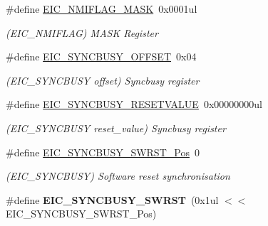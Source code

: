 \begin{DoxyCompactItemize}
\item 
\hypertarget{group___s_a_m_l21___e_i_c_ga540d29cea93e30799215ac9a446bb8f9}{}\#define \hyperlink{group___s_a_m_l21___e_i_c_ga540d29cea93e30799215ac9a446bb8f9}{E\+I\+C\+\_\+\+N\+M\+I\+F\+L\+A\+G\+\_\+\+M\+A\+S\+K}~0x0001ul\label{group___s_a_m_l21___e_i_c_ga540d29cea93e30799215ac9a446bb8f9}

\begin{DoxyCompactList}\small\item\em (E\+I\+C\+\_\+\+N\+M\+I\+F\+L\+A\+G) M\+A\+S\+K Register \end{DoxyCompactList}\item 
\hypertarget{group___s_a_m_l21___e_i_c_ga6afc82df170c16a0de7830c246f58283}{}\#define \hyperlink{group___s_a_m_l21___e_i_c_ga6afc82df170c16a0de7830c246f58283}{E\+I\+C\+\_\+\+S\+Y\+N\+C\+B\+U\+S\+Y\+\_\+\+O\+F\+F\+S\+E\+T}~0x04\label{group___s_a_m_l21___e_i_c_ga6afc82df170c16a0de7830c246f58283}

\begin{DoxyCompactList}\small\item\em (E\+I\+C\+\_\+\+S\+Y\+N\+C\+B\+U\+S\+Y offset) Syncbusy register \end{DoxyCompactList}\item 
\hypertarget{group___s_a_m_l21___e_i_c_gae3efd05adc4143a8591f22ae441c5cc4}{}\#define \hyperlink{group___s_a_m_l21___e_i_c_gae3efd05adc4143a8591f22ae441c5cc4}{E\+I\+C\+\_\+\+S\+Y\+N\+C\+B\+U\+S\+Y\+\_\+\+R\+E\+S\+E\+T\+V\+A\+L\+U\+E}~0x00000000ul\label{group___s_a_m_l21___e_i_c_gae3efd05adc4143a8591f22ae441c5cc4}

\begin{DoxyCompactList}\small\item\em (E\+I\+C\+\_\+\+S\+Y\+N\+C\+B\+U\+S\+Y reset\+\_\+value) Syncbusy register \end{DoxyCompactList}\item 
\hypertarget{group___s_a_m_l21___e_i_c_gaac50cf18f144db471cdcd45ba2c5604d}{}\#define \hyperlink{group___s_a_m_l21___e_i_c_gaac50cf18f144db471cdcd45ba2c5604d}{E\+I\+C\+\_\+\+S\+Y\+N\+C\+B\+U\+S\+Y\+\_\+\+S\+W\+R\+S\+T\+\_\+\+Pos}~0\label{group___s_a_m_l21___e_i_c_gaac50cf18f144db471cdcd45ba2c5604d}

\begin{DoxyCompactList}\small\item\em (E\+I\+C\+\_\+\+S\+Y\+N\+C\+B\+U\+S\+Y) Software reset synchronisation \end{DoxyCompactList}\item 
\hypertarget{group___s_a_m_l21___e_i_c_ga951969503d8b7f088d0bd764c3fc9e0b}{}\#define {\bfseries E\+I\+C\+\_\+\+S\+Y\+N\+C\+B\+U\+S\+Y\+\_\+\+S\+W\+R\+S\+T}~(0x1ul $<$$<$ E\+I\+C\+\_\+\+S\+Y\+N\+C\+B\+U\+S\+Y\+\_\+\+S\+W\+R\+S\+T\+\_\+\+Pos)\label{group___s_a_m_l21___e_i_c_ga951969503d8b7f088d0bd764c3fc9e0b}


\end{DoxyCompactItemize}
